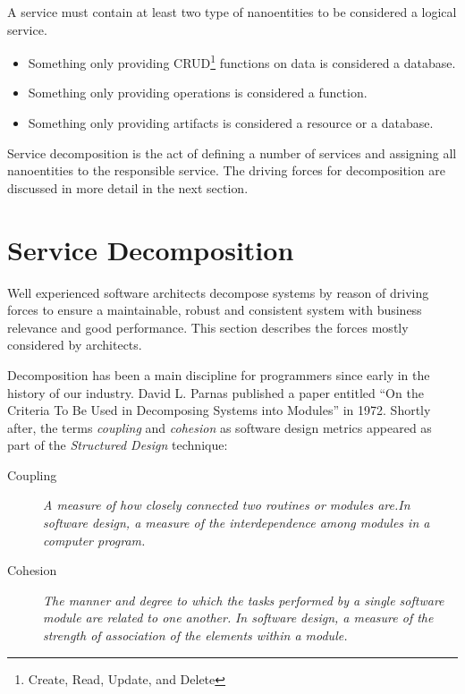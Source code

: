 A service must contain  at least two type of nanoentities to be considered a logical service. 
\begin{itemize}
\item Something only providing CRUD\footnote{Create, Read, Update, and Delete} functions on data is considered a database. 
\item Something only providing operations is considered a function. 
\item Something only providing artifacts is considered a resource or a database. 
\end{itemize}

Service decomposition is the act of defining a number of services and assigning all nanoentities to the responsible service. The driving forces for decomposition are discussed in more detail in the next section.


\section{Service Decomposition}

Well experienced software architects decompose systems by reason of driving forces to ensure a maintainable, robust and consistent system with business relevance and good performance. This section describes the forces mostly considered by architects. 

Decomposition has been a main discipline for programmers since early in the history of our industry. David L. Parnas published a paper entitled \enquote{On the Criteria To Be Used in Decomposing Systems into Modules} in 1972\cite{parnaDecomposing}. Shortly after, the terms \textit{coupling} and \textit{cohesion} as software design metrics appeared as part of the \textit{Structured Design} technique\cite{structuredDesign}:

\begin{description}
	\item[Coupling] \textit{A measure of how closely connected two routines or modules are.\newline In	software design, a measure of the interdependence among modules in a computer program.}\cite{softwareVocabulary}
	\item[Cohesion] \textit{The manner and degree to which the tasks performed by a single software module are related to one another.} \newline 
	\textit{In software design, a measure of the strength of association of the elements within a module.}\cite{softwareVocabulary}
\end{description}

